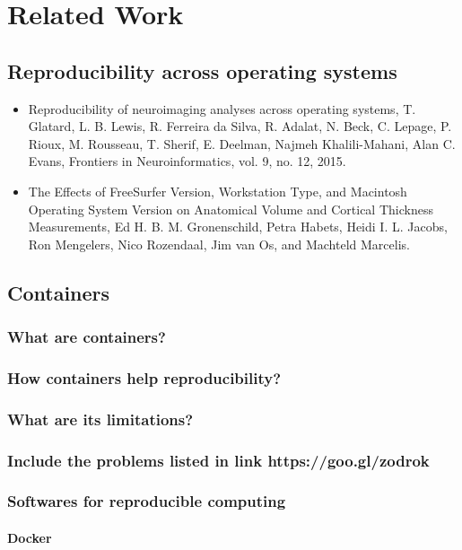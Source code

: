 \chapter{Related Work}

\section{Reproducibility across operating systems}
\begin{itemize}
 \item Reproducibility of neuroimaging analyses across operating systems, T. Glatard, L. B. Lewis, R. Ferreira da Silva, R. Adalat, N. Beck, C. Lepage, P. Rioux, M. Rousseau, T. Sherif, E. Deelman, Najmeh Khalili-Mahani, Alan C. Evans, Frontiers in Neuroinformatics, vol. 9, no. 12, 2015.
 \item The Effects of FreeSurfer Version, Workstation Type, and Macintosh Operating System Version on Anatomical Volume and Cortical Thickness Measurements, Ed H. B. M. Gronenschild, Petra Habets, Heidi I. L. Jacobs, Ron Mengelers, Nico Rozendaal, Jim van Os, and Machteld Marcelis.
\end{itemize}

\section{Containers}
\subsection{What are containers?}
\subsection{How containers help reproducibility?}
\subsection{What are its limitations?}
\subsection{Include the problems listed in link https://goo.gl/zodrok}
\subsection{Softwares for reproducible computing}
\subsubsection{Docker}
